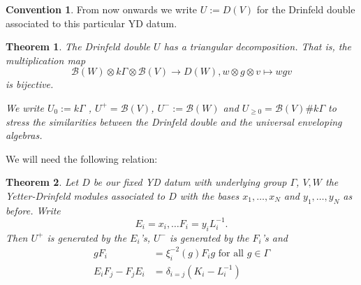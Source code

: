 \documentclass{amsart}
\newtheorem{theorem}{Theorem}[section]
\theoremstyle{definition}
\newtheorem*{convention}{Convention}
\newcommand{\Nichols}[1]{\ensuremath{\mathcal{B}(#1)}}
\begin{document}
\begin{convention}
	From now onwards we  write $U:=D(V)$ for the Drinfeld double associated to this particular YD datum.
\end{convention}

\begin{theorem}
	The Drinfeld double $U$ has a triangular decomposition. That is,
	the multiplication map
	$$
	\Nichols W \otimes k \Gamma \otimes \Nichols V \rightarrow D(W),
	w\otimes g \otimes v \mapsto wgv
	$$
	is bijective.
	
	We write $U_0 := k \Gamma$ , $U^+ = \Nichols V$, $U^- := \Nichols W$ and $U_{\geq 0} = \Nichols V \# k \Gamma$ to stress the similarities between the Drinfeld double and the universal enveloping algebras.
\end{theorem}

We will need the following relation:
\begin{theorem}{{\cite[3.2]{Andruskiewitsch2010}}}
	Let $D$ be our fixed YD datum with underlying group $\Gamma$, $V, W$ the Yetter-Drinfeld modules associated to $D$ with the bases $x_1,\dotsc, x_N$ and $y_1, \dotsc, y_N$ as before. 
	Write
	$$
	E_i = x_i ,\dotsc 
	F_i = y_iL_i^{-1}.
	$$
	Then $U^+$ is generated by the $E_i$'s, $U^-$ is generated by the $F_i$'s and 
	\begin{align}
		g F_i &= \xi_i^{-2}(g) F_i g \text{ for all } g \in \Gamma
		\label{eq: grpExchange}
		\\
		E_i F_j - F_j E_i &= \delta_{i=j} (K_i - L_i^{-1})
		\label{eq: EF-exchange}
	\end{align}
\end{theorem}
\end{document}
